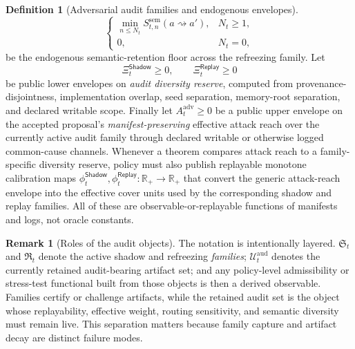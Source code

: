 \documentclass[11pt]{article}
\theoremstyle{definition}
\newtheorem{definition}[theorem]{Definition}
\newtheorem{remark}[theorem]{Remark}
\newcommand{\R}{\mathbb{R}}
\newcommand{\1}{\mathbf{1}}
\newcommand{\Shadow}{\mathsf{Shadow}}
\newcommand{\Replay}{\mathsf{Replay}}
\begin{document}
\begin{definition}[Adversarial audit families and endogenous envelopes]
\[\begin{cases}
\min\limits_{n\le N_t} S_{t,n}^{\mathrm{sem}}(a\rightsquigarrow a'), & N_t\ge 1,\\[0.8ex]
0, & N_t=0,
\end{cases}
\]
be the endogenous semantic-retention floor across the refreezing family. Let
\[
\Xi_t^{\Shadow}\ge 0,
\qquad
\Xi_t^{\Replay}\ge 0
\]
be public lower envelopes on \emph{audit diversity reserve}, computed from provenance-disjointness, implementation overlap, seed separation, memory-root separation, and declared writable scope. Finally let $A_t^{\mathrm{adv}}\ge0$ be a public upper envelope on the accepted proposal's \emph{manifest-preserving} effective attack reach over the currently active audit family through declared writable or otherwise logged common-cause channels. Whenever a theorem compares attack reach to a family-specific diversity reserve, policy must also publish replayable monotone calibration maps $\phi_t^{\Shadow},\phi_t^{\Replay}:\R_+\to\R_+$ that convert the generic attack-reach envelope into the effective cover units used by the corresponding shadow and replay families. All of these are observable-or-replayable functions of manifests and logs, not oracle constants.
\end{definition}


\begin{remark}[Roles of the audit objects]\label{rem:audit_roles}
The notation is intentionally layered. $\mathfrak S_t$ and $\mathfrak R_t$ denote the active shadow and refreezing \emph{families}; $\mathcal U_t^{\mathrm{aud}}$ denotes the currently retained audit-bearing artifact set; and any policy-level admissibility or stress-test functional built from those objects is then a derived observable. Families certify or challenge artifacts, while the retained audit set is the object whose replayability, effective weight, routing sensitivity, and semantic diversity must remain live. This separation matters because family capture and artifact decay are distinct failure modes.
\end{remark}
\end{document}
